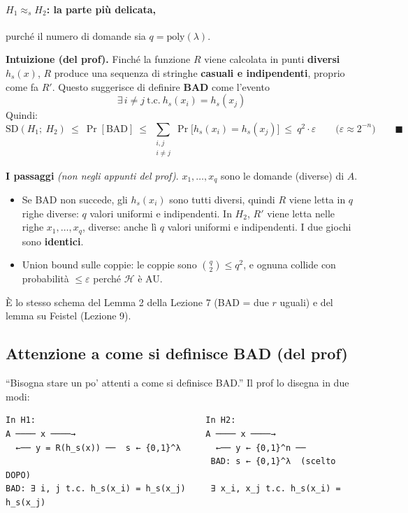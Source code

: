 \paragraph{\(H_1 \approx_s H_2\): la parte più delicata,} purché il numero di domande sia \(q = \text{poly}(\lambda)\).

\textbf{Intuizione (del prof).} Finché la funzione \(R\) viene calcolata in punti \textbf{diversi} \(h_s(x)\), \(R\) produce una sequenza di stringhe \textbf{casuali e indipendenti}, proprio come fa \(R'\). Questo suggerisce di definire \textbf{BAD} come l'evento
\[
\exists\, i \ne j \ \text{t.c.} \ h_s(x_i) = h_s(x_j)
\]
Quindi:
\[
\text{SD}(H_1;\ H_2) \ \le\ \Pr[\text{BAD}] \ \le\ \sum_{\substack{i, j \\ i \ne j}} \Pr\big[h_s(x_i) = h_s(x_j)\big] \ \le\ q^2 \cdot \varepsilon \qquad \big(\varepsilon \approx 2^{-n}\big) \qquad \blacksquare
\]

\begin{nota}
\textbf{I passaggi} \emph{(non negli appunti del prof)}. \(x_1, \dots, x_q\) sono le domande (diverse) di \(A\).
\begin{itemize}
  \item Se BAD non succede, gli \(h_s(x_i)\) sono tutti diversi, quindi \(R\) viene letta in \(q\) righe diverse: \(q\) valori uniformi e indipendenti. In \(H_2\), \(R'\) viene letta nelle righe \(x_1, \dots, x_q\), diverse: anche lì \(q\) valori uniformi e indipendenti. I due giochi sono \textbf{identici}.
  \item Union bound sulle coppie: le coppie sono \(\binom{q}{2} \le q^2\), e ognuna collide con probabilità \(\le \varepsilon\) perché \(\mathcal{H}\) è AU.
\end{itemize}
È lo stesso schema del Lemma 2 della Lezione 7 (BAD = due \(r\) uguali) e del lemma su Feistel (Lezione 9).
\end{nota}

\subsection{Attenzione a come si definisce BAD (del prof)}

``Bisogna stare un po' attenti a come si definisce BAD.'' Il prof lo disegna in due modi:

\begin{verbatim}
In H1:                                  In H2:
A ──── x ────→                          A ──── x ────→
  ←── y = R(h_s(x)) ──  s ← {0,1}^λ       ←── y ← {0,1}^n ──
                                         BAD: s ← {0,1}^λ  (scelto DOPO)
BAD: ∃ i, j t.c. h_s(x_i) = h_s(x_j)     ∃ x_i, x_j t.c. h_s(x_i) = h_s(x_j)
\end{verbatim}

